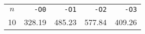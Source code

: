 \begin{center}
  \bgroup{}
  \begin{tabular}{c|rrrr}
    \hline
    $n$ & \texttt{-O0} & \texttt{-O1} & \texttt{-O2} & \texttt{-O3} \\
    \hhline{=====}
    10 & 328.19 & 485.23 & 577.84 & 409.26 \\
    \hline
  \end{tabular}
  \egroup
\end{center}
